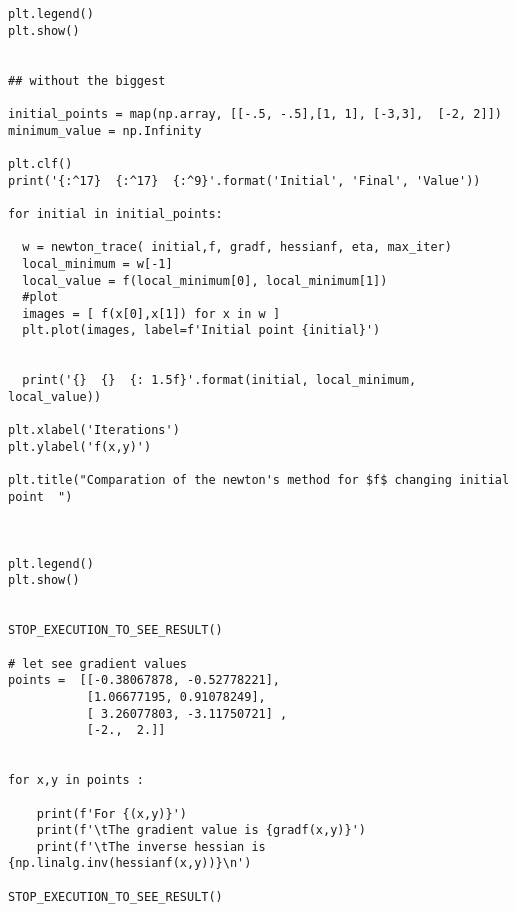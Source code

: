 \begin{verbatim}
plt.legend()
plt.show()


## without the biggest

initial_points = map(np.array, [[-.5, -.5],[1, 1], [-3,3],  [-2, 2]])
minimum_value = np.Infinity

plt.clf()
print('{:^17}  {:^17}  {:^9}'.format('Initial', 'Final', 'Value'))

for initial in initial_points:
 
  w = newton_trace( initial,f, gradf, hessianf, eta, max_iter)
  local_minimum = w[-1]
  local_value = f(local_minimum[0], local_minimum[1])
  #plot
  images = [ f(x[0],x[1]) for x in w ]
  plt.plot(images, label=f'Initial point {initial}')
  

  print('{}  {}  {: 1.5f}'.format(initial, local_minimum, local_value))

plt.xlabel('Iterations')
plt.ylabel('f(x,y)')

plt.title("Comparation of the newton's method for $f$ changing initial point  ")



plt.legend()
plt.show()
  
  
STOP_EXECUTION_TO_SEE_RESULT()

# let see gradient values 
points =  [[-0.38067878, -0.52778221],
           [1.06677195, 0.91078249],
           [ 3.26077803, -3.11750721] ,
           [-2.,  2.]]
             

for x,y in points :
    
    print(f'For {(x,y)}')
    print(f'\tThe gradient value is {gradf(x,y)}')
    print(f'\tThe inverse hessian is {np.linalg.inv(hessianf(x,y))}\n')

STOP_EXECUTION_TO_SEE_RESULT()

\end{verbatim}